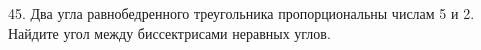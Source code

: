 45. Два угла равнобедренного треугольника пропорциональны числам 5 и 2. Найдите угол между биссектрисами неравных углов.\\
